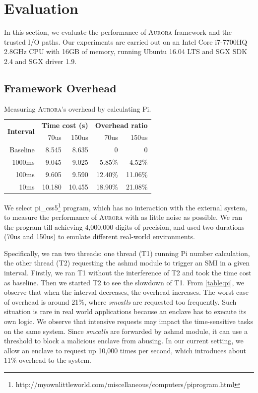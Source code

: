 \section{Evaluation}\label{performance}

In this section, we evaluate the performance of \textsc{Aurora} framework and the trusted I/O paths. Our experiments are carried out on  an Intel Core i7-7700HQ 2.8GHz CPU with 16GB of memory, running Ubuntu 16.04 LTS and SGX SDK 2.4 and SGX driver 1.9.

\subsection{Framework Overhead}

\begin{table}
	\centering
	\caption{Measuring \textsc{Aurora}'s overhead by calculating Pi.}
	\label{table:pi}
	\begin{tabular}{rrrrr}
		\toprule
		\multirow{2}{*}{\textbf{Interval}} & \multicolumn{2}{c}{\textbf{Time cost (s)}} & \multicolumn{2}{c}{\textbf{Overhead ratio}} \\\cmidrule{2-3}	 \cmidrule{4-5}
		& 70us & 150us & 70us & 150us \\
		\midrule
		Baseline & 8.545 & 8.635 & 0 & 0\\
		1000ms & 9.045 & 9.025 & 5.85\% & 4.52\%\\
		100ms & 9.605 & 9.590 & 12.40\% & 11.06\%\\
		10ms & 10.180 & 10.455 & 18.90\% & 21.08\%\\
		\bottomrule
	\end{tabular}
\end{table}

We select  pi\_css5\footnote{http://myownlittleworld.com/miscellaneous/computers/piprogram.html} program, which has no interaction with the external system, to measure the performance of \textsc{Aurora} with as little noise as possible. We ran the program till achieving 4,000,000 digits of precision, and used two durations (70us and 150us) to emulate different real-world environments.

Specifically, we ran two threads: one thread (T1) running Pi number calculation, the other thread (T2) requesting the ashmd module to trigger an SMI in a given interval. Firstly, we ran T1 without the interference of T2 and took the time cost as baseline. Then we started T2 to see the slowdown of T1. From \autoref{table:pi}, we observe that when the interval decreases, the overhead increases. The worst case of overhead is around 21\%, where \textit{smcalls} are requested too frequently. Such situation is rare in real world applications because an enclave has to execute its own logic. We observe that intensive requests may impact the time-sensitive tasks on the same system. Since \textit{smcalls} are forwarded by ashmd module, it can use a threshold to block a malicious enclave from abusing. In our current setting, we allow an enclave to request up 10,000 times per second, which introduces about 11\% overhead to the system.

